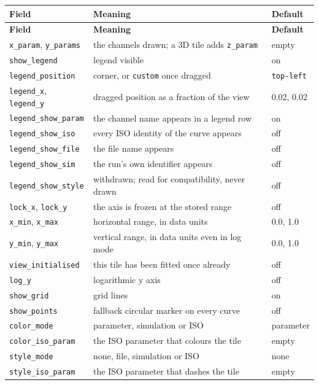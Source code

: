 \documentclass[11pt,a4paper,oneside]{report}
\newcommand{\code}[1]{\texttt{#1}}
\begin{document}
\begin{center}
\small
\begin{longtable}{@{}p{}p{}p{}@{}}
\toprule
\textbf{Field} & \textbf{Meaning} & \textbf{Default} \\
\midrule
\endfirsthead
\toprule
\textbf{Field} & \textbf{Meaning} & \textbf{Default} \\
\midrule
\endhead
\code{x\_param}, \code{y\_params} & the channels drawn; a 3D tile adds \code{z\_param} & empty \\
\code{show\_legend} & legend visible & on \\
\code{legend\_position} & corner, or \code{custom} once dragged & \code{top-left} \\
\code{legend\_x}, \code{legend\_y} & dragged position as a fraction of the view & 0.02, 0.02 \\
\code{legend\_show\_param} & the channel name appears in a legend row & on \\
\code{legend\_show\_iso} & every ISO identity of the curve appears & off \\
\code{legend\_show\_file} & the file name appears & off \\
\code{legend\_show\_sim} & the run's own identifier appears & off \\
\code{legend\_show\_style} & withdrawn; read for compatibility, never drawn & off \\
\code{lock\_x}, \code{lock\_y} & the axis is frozen at the stored range & off \\
\code{x\_min}, \code{x\_max} & horizontal range, in data units & 0.0, 1.0 \\
\code{y\_min}, \code{y\_max} & vertical range, in data units even in log mode & 0.0, 1.0 \\
\code{view\_initialised} & this tile has been fitted once already & off \\
\code{log\_y} & logarithmic y axis & off \\
\code{show\_grid} & grid lines & on \\
\code{show\_points} & fallback circular marker on every curve & off \\
\code{color\_mode} & parameter, simulation or ISO & parameter \\
\code{color\_iso\_param} & the ISO parameter that colours the tile & empty \\
\code{style\_mode} & none, file, simulation or ISO & none \\
\code{style\_iso\_param} & the ISO parameter that dashes the tile & empty \\

\end{longtable}
\end{center}
\end{document}
